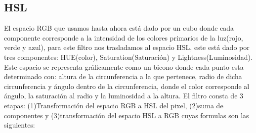 \documentclass[a4paper]{article}
\begin{document}
\subsection{HSL}
El espacio RGB que usamos hasta ahora está dado por un cubo donde cada componente corresponde a la intensidad de los colores primarios de la luz(rojo, verde y azul), para este filtro nos trasladamos al espacio HSL, este está dado por tres componentes: HUE(color), Saturation(Saturación) y Lightness(Luminosidad). Este espacio se representa gráficamente como un bicono donde cada punto esta determinado con: altura de la circunferencia a la que pertenece, radio de dicha circunferencia y ángulo dentro de la circunferencia, donde el color corresponde al ángulo, la saturación al radio y la luminosidad a la altura.
El filtro consta de 3 etapas: (1)Transformación del espacio RGB a HSL del pixel, (2)suma de componentes y (3)transformación del espacio HSL a RGB cuyas formulas son las siguientes:
\newline
\end{document}
